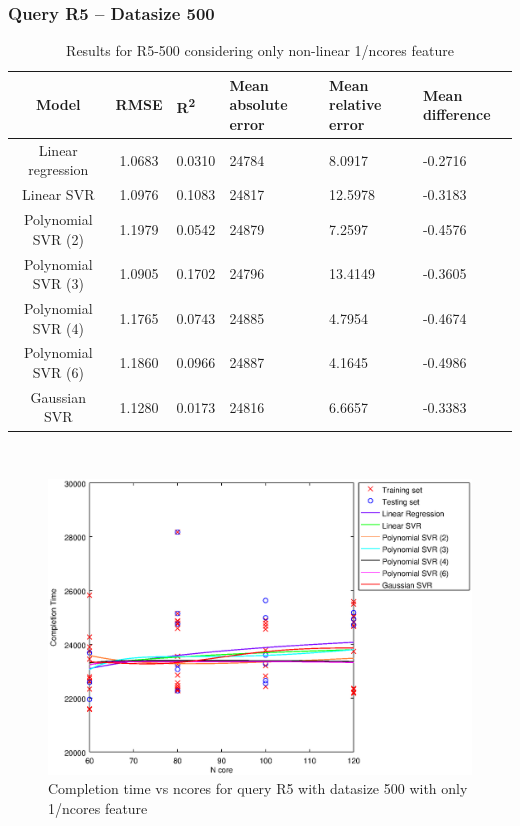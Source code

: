 \documentclass[a4paper,11pt]{article}
\begin{document}
\newpage
\subsubsection{Query R5 -- Datasize 500}
\begin{table}[H]
	\centering
	\begin{adjustbox}{center}
		\begin{tabular}{c | c M{1.2cm} M{2.5cm} M{2.5cm} M{1.8cm}}
			Model & RMSE & R\textsuperscript{2} & Mean absolute error & Mean relative error & Mean difference \tabularnewline
			\hline
			Linear regression & 1.0683 & 0.0310 &  24784 & 8.0917 & -0.2716 \\
			Linear SVR & 1.0976 & 0.1083 &  24817 & 12.5978 & -0.3183 \\
			Polynomial SVR (2) & 1.1979 & 0.0542 &  24879 & 7.2597 & -0.4576 \\
			Polynomial SVR (3) & 1.0905 & 0.1702 &  24796 & 13.4149 & -0.3605 \\
			Polynomial SVR (4) & 1.1765 & 0.0743 &  24885 & 4.7954 & -0.4674 \\
			Polynomial SVR (6) & 1.1860 & 0.0966 &  24887 & 4.1645 & -0.4986 \\
			Gaussian SVR & 1.1280 & 0.0173 &  24816 & 6.6657 & -0.3383 \\
		\end{tabular}
	\end{adjustbox}
	\\
	\caption{Results for R5-500 considering only non-linear 1/ncores feature}
	\label{table_R5_prediction_all}
\end{table}

\begin {figure}[hbtp]
\centering
\includegraphics[width=\textwidth]{output/R5_500_ONLY_1_OVER_NCORES/plot_R5_500.eps}
\caption {Completion time vs ncores for query R5 with datasize 500 with only 1/ncores feature}
\end {figure}
\end{document}
